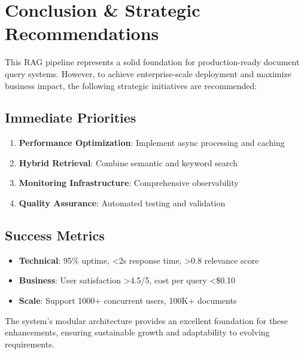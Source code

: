 \documentclass[12pt,a4paper]{article}
\begin{document}
\section{Conclusion \& Strategic Recommendations}

This RAG pipeline represents a solid foundation for production-ready document query systems. However, to achieve enterprise-scale deployment and maximize business impact, the following strategic initiatives are recommended:

\subsection{Immediate Priorities}
\begin{enumerate}
    \item \textbf{Performance Optimization}: Implement async processing and caching
    \item \textbf{Hybrid Retrieval}: Combine semantic and keyword search
    \item \textbf{Monitoring Infrastructure}: Comprehensive observability
    \item \textbf{Quality Assurance}: Automated testing and validation
\end{enumerate}

\subsection{Success Metrics}
\begin{itemize}
    \item \textbf{Technical}: 95\% uptime, <2s response time, >0.8 relevance score
    \item \textbf{Business}: User satisfaction >4.5/5, cost per query <\$0.10
    \item \textbf{Scale}: Support 1000+ concurrent users, 100K+ documents
\end{itemize}

The system's modular architecture provides an excellent foundation for these enhancements, ensuring sustainable growth and adaptability to evolving requirements.
\end{document}
